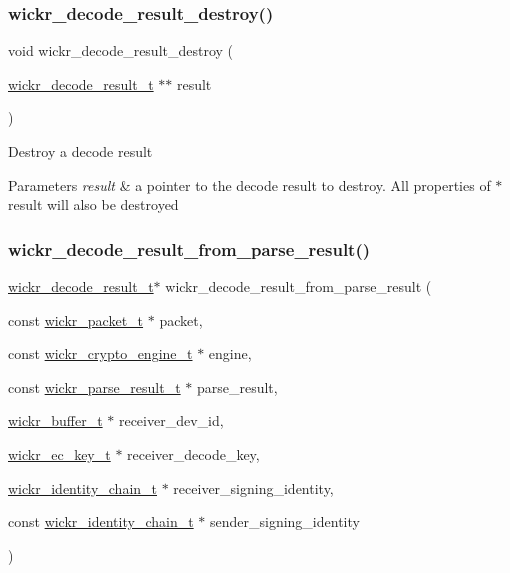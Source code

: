 \subsubsection{\texorpdfstring{wickr\+\_\+decode\+\_\+result\+\_\+destroy()}{wickr\_decode\_result\_destroy()}}
{\footnotesize\ttfamily void wickr\+\_\+decode\+\_\+result\+\_\+destroy (\begin{DoxyParamCaption}\item[{\mbox{\hyperlink{structwickr__decode__result}{wickr\+\_\+decode\+\_\+result\+\_\+t}} $\ast$$\ast$}]{result }\end{DoxyParamCaption})}

Destroy a decode result


\begin{DoxyParams}{Parameters}
{\em result} & a pointer to the decode result to destroy. All properties of \textquotesingle{}$\ast$result\textquotesingle{} will also be destroyed \\
\hline
\end{DoxyParams}
\mbox{\label{group__wickr__protocol_ga32d9da2e10d1d653b2ac894d50aaedb0}} 
\subsubsection{\texorpdfstring{wickr\+\_\+decode\+\_\+result\+\_\+from\+\_\+parse\+\_\+result()}{wickr\_decode\_result\_from\_parse\_result()}}
{\footnotesize\ttfamily \mbox{\hyperlink{structwickr__decode__result}{wickr\+\_\+decode\+\_\+result\+\_\+t}}$\ast$ wickr\+\_\+decode\+\_\+result\+\_\+from\+\_\+parse\+\_\+result (\begin{DoxyParamCaption}\item[{const \mbox{\hyperlink{structwickr__packet}{wickr\+\_\+packet\+\_\+t}} $\ast$}]{packet,  }\item[{const \mbox{\hyperlink{structwickr__crypto__engine}{wickr\+\_\+crypto\+\_\+engine\+\_\+t}} $\ast$}]{engine,  }\item[{const \mbox{\hyperlink{structwickr__parse__result}{wickr\+\_\+parse\+\_\+result\+\_\+t}} $\ast$}]{parse\+\_\+result,  }\item[{\mbox{\hyperlink{structwickr__buffer}{wickr\+\_\+buffer\+\_\+t}} $\ast$}]{receiver\+\_\+dev\+\_\+id,  }\item[{\mbox{\hyperlink{structwickr__ec__key}{wickr\+\_\+ec\+\_\+key\+\_\+t}} $\ast$}]{receiver\+\_\+decode\+\_\+key,  }\item[{\mbox{\hyperlink{structwickr__identity__chain}{wickr\+\_\+identity\+\_\+chain\+\_\+t}} $\ast$}]{receiver\+\_\+signing\+\_\+identity,  }\item[{const \mbox{\hyperlink{structwickr__identity__chain}{wickr\+\_\+identity\+\_\+chain\+\_\+t}} $\ast$}]{sender\+\_\+signing\+\_\+identity }\end{DoxyParamCaption})}

